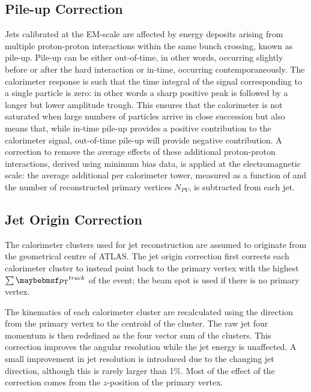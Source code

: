 \subsection{Pile-up Correction}
\label{sec:analysis-tools:pileup_correction}
Jets calibrated at the EM-scale are affected by energy deposits arising from multiple proton-proton interactions within the same bunch crossing, known as
pile-up.
Pile-up can be either out-of-time, in other words, occurring slightly before or after the hard interaction or in-time, occurring contemporaneously.
The \ATLAS calorimeter response is such that the time integral of the signal corresponding to a single particle is zero: in other words a sharp positive peak is followed by a longer but lower amplitude trough.
This ensures that the calorimeter is not saturated when large numbers of particles arrive in close succession but also means that, while in-time pile-up provides a positive contribution to the calorimeter signal, out-of-time pile-up will provide negative contribution.
A correction to remove the average effects of these additional proton-proton interactions, derived using minimum bias data, is applied at the electromagnetic scale: the average additional \ET per calorimeter tower, measured as a function of \pseudorap and the number of reconstructed primary vertices $N_{PV}$, is subtracted from each jet.

\subsection{Jet Origin Correction}
The calorimeter clusters used for jet reconstruction are assumed to originate from the geometrical centre of ATLAS.
The jet origin correction first corrects each calorimeter cluster to instead point back to the primary vertex with the highest $\sum{\pT^{track}}$ of the event; the beam spot is used if there is no primary vertex.

The kinematics of each calorimeter cluster are recalculated using the direction from the primary vertex to the centroid of the cluster.
The raw jet four momentum is then redefined as the four vector sum of the clusters.
This correction improves the angular resolution while the jet energy is unaffected.
A small improvement in jet \pT resolution is introduced due to the changing jet direction, although this is rarely larger than 1\%.
Most of the effect of the correction comes from the $z$-position of the primary vertex.

